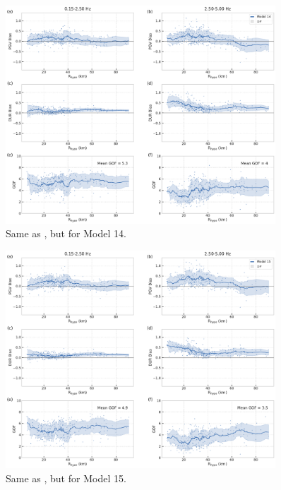 \begin{figure}[!ht]
  \centering
  \includegraphics[width=0.9\textwidth,height=0.9\textheight,keepaspectratio]{figures/figure_highf_S24.pdf}
  \caption{Same as , but for Model 14.
  }
\label{fig:highf-S24}
\end{figure}
\clearpage


\begin{figure}[!ht]
  \centering
  \includegraphics[width=0.9\textwidth,height=0.9\textheight,keepaspectratio]{figures/figure_highf_S25.pdf}
  \caption{Same as , but for Model 15.
  }
\label{fig:highf-S25}
\end{figure}
\clearpage


